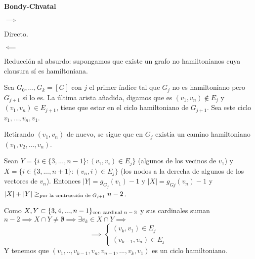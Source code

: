 \documentclass[openany]{book}
\begin{document}

\begin{theorem}
    {\color{turquoise} \textbf{Bondy-Chvatal}}
\end{theorem}

\begin{demonstration}

    $ \implies $

    Directo.

    $ \impliedby $

    Reducción al absurdo: supongamos que existe un grafo no hamiltonianos cuya clausura sí es hamiltoniana.
    
    Sea $ G_0,...,G_k = [G] $ con $ j $ el primer índice tal que $ G_{j} $ no es hamiltoniano pero $ G_{j+1} $ sí lo es. La última arista añadida, digamos que es $ (v_1,v_n) \not \in E_j $ y $ (v_1,v_n) \in E_{j+1} $, tiene que estar en el ciclo hamiltoniano de $ G_{j+1} $. Sea este ciclo $ v_1,...,v_n,v_1 $.
    
    Retirando $ (v_1,v_n) $ de nuevo, se sigue que en $ G_j $ existía un camino hamiltoniano $ (v_1,v_2,...,v_n) $.
    
    Sean $ Y = \{i \in \{3,...,n-1\} : (v_1,v_i) \in E_j\} $ (algunos de los vecinos de $ v_1 $) y $ X = \{i \in \{3,...,n+1\}:(v_n,i) \in E_j\} $ (los nodos a la derecha de algunos de los vectores de $ v_n $). Entonces $ |Y| = g_{G_j}(v_1) -1$ y $ |X| = g_{Gj}(v_n)-1 $ y $ |X| + |Y| \geq_{\text{por la contrucción de $ G_{j+1} $}} n-2  $.

    Como $ X,Y \subset \{3,4,...,n-1\}_{\text{con cardinal $ n-3 $}} $ y sus cardinales suman $ n-2 \implies X \cap Y \ne \emptyset \implies \exists v_{k} \in X \cap Y \implies $
    $$ \implies \left\{
    \begin{array}{l}
        (v_{k},v_1) \in E_j\\
        (v_{k-1},v_n) \in E_j
    \end{array}
    \right. $$
    Y tenemos que $ (v_1,..,v_{k-1},v_{n},v_{n-1},...,v_{k},v_{1}) $ es un ciclo hamiltoniano.
\end{demonstration}


\end{document}
